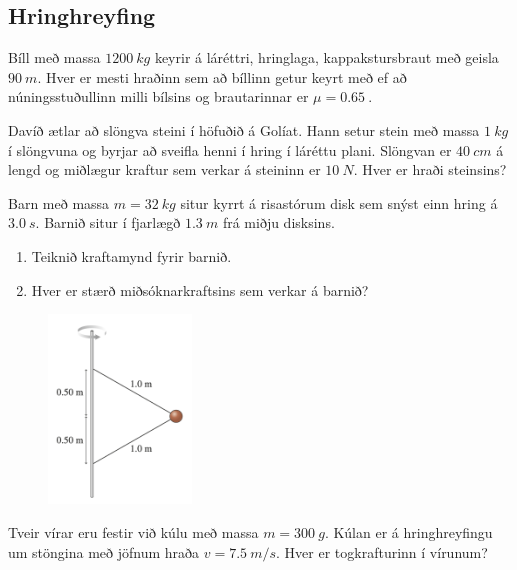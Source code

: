 \ifdefined \wholebook \else\documentclass[oneside]{book}\usepackage{EdlBook}\graphicspath{{figures/}}
\begin{document}
\begin{enumerate}[label = \textbf{Dæmi \thechapter.\arabic*.}]
\subsection*{Hringhreyfing}

\item Bíll með massa $\SI{1200}{kg}$ keyrir á láréttri, hringlaga, kappakstursbraut með geisla $\SI{90}{m}$. Hver er mesti hraðinn sem að bíllinn getur keyrt með ef að núningsstuðullinn milli bílsins og brautarinnar er $\mu = \SI{0.65}{}$.

\item Davíð ætlar að slöngva steini í höfuðið á Golíat. Hann setur stein með massa $\SI{1}{kg}$ í slöngvuna og byrjar að sveifla henni í hring í láréttu plani. Slöngvan er $\SI{40}{cm}$ á lengd og miðlægur kraftur sem verkar á steininn er $\SI{10}{N}$. Hver er hraði steinsins?

\item Barn með massa $m = \SI{32}{kg}$ situr kyrrt á risastórum disk sem snýst einn hring á $\SI{3.0}{s}$. Barnið situr í fjarlægð $\SI{1.3}{m}$ frá miðju disksins.
\begin{enumerate}[label = \textbf{(\alph*)}]
    \item Teiknið kraftamynd fyrir barnið.
    \item Hver er stærð miðsóknarkraftsins sem verkar á barnið?
\end{enumerate}

\begin{minipage}{\linewidth}
\begin{figure}
\vspace{-2.5cm}
\includegraphics[width=1.5in]{images/hringhreyfing1.png}
\end{figure}

\item Tveir vírar eru festir við kúlu með massa $m = \SI{300}{g}$. Kúlan er á hringhreyfingu um stöngina með jöfnum hraða $v = \SI{7.5}{m/s}$. Hver er togkrafturinn í vírunum?
\end{minipage}


\end{enumerate}
\end{document}

